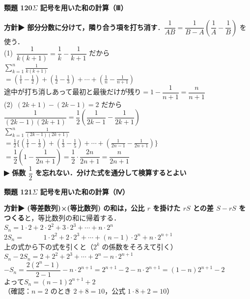 \documentclass[a4paper,11pt]{ltjsarticle}
\newcommand{\ans}[2]{\Needspace{5\baselineskip}\vspace{6pt}%
  {\sffamily\bfseries 類題 #1\quad #2}\par}
\newcommand{\point}[1]{\textsf{\bfseries ▶ #1}}
\begin{document}
\ans{120}{$\Sigma$ 記号を用いた和の計算（Ⅲ）}
\begin{kai}
\textbf{方針}\quad \point{部分分数に分けて，隣り合う項を打ち消す}．$\dfrac1{AB}=\dfrac1{B-A}\left(\dfrac1A-\dfrac1B\right)$ を使う．\\[2pt]
(1)\ $\dfrac1{k(k+1)}=\dfrac1k-\dfrac1{k+1}$ だから\\
\hspace*{1.5em}$\displaystyle\sum_{k=1}^n\frac1{k(k+1)}$\\
\hspace*{3em}$\displaystyle=\left(\frac11-\frac12\right)+\left(\frac12-\frac13\right)+\cdots+\left(\frac1n-\frac1{n+1}\right)$\\
\hspace*{1.5em}途中が打ち消しあって最初と最後だけが残り\quad $=1-\dfrac1{n+1}=\dfrac n{n+1}$\\[2pt]
(2)\ $(2k+1)-(2k-1)=2$ だから\quad $\dfrac1{(2k-1)(2k+1)}=\dfrac12\left(\dfrac1{2k-1}-\dfrac1{2k+1}\right)$\\
\hspace*{1.5em}$\displaystyle\sum_{k=1}^n\frac1{(2k-1)(2k+1)}$\\
\hspace*{3em}$\displaystyle=\frac12\biggl\{\left(\frac11-\frac13\right)+\left(\frac13-\frac15\right)+\cdots+\left(\frac1{2n-1}-\frac1{2n+1}\right)\biggr\}$\\
\hspace*{1.5em}$=\dfrac12\left(1-\dfrac1{2n+1}\right)=\dfrac12\cdot\dfrac{2n}{2n+1}=\dfrac n{2n+1}$\\
\hspace*{1.5em}\point{係数 $\dfrac12$ を忘れない．分けた式を通分して検算するとよい}
\end{kai}

\ans{121}{$\Sigma$ 記号を用いた和の計算（Ⅳ）}
\begin{kai}
\textbf{方針}\quad \point{(等差数列)×(等比数列) の和は，公比 $r$ を掛けた $rS$ との差 $S-rS$ をつくる}と，等比数列の和に帰着する．\\[2pt]
$S_n=1\cdot2+2\cdot2^2+3\cdot2^3+\cdots+n\cdot2^n$\\
$2S_n=\phantom{1\cdot2+{}}1\cdot2^2+2\cdot2^3+\cdots+(n-1)\cdot2^n+n\cdot2^{n+1}$\\[2pt]
上の式から下の式を引くと（$2^k$ の係数をそろえて引く）\\
\hspace*{1.5em}$S_n-2S_n=2+2^2+2^3+\cdots+2^n-n\cdot2^{n+1}$\\
\hspace*{1.5em}$-S_n=\dfrac{2(2^n-1)}{2-1}-n\cdot2^{n+1}=2^{n+1}-2-n\cdot2^{n+1}=(1-n)2^{n+1}-2$\\[2pt]
よって\quad $S_n=(n-1)2^{n+1}+2$\\
（確認：$n=2$ のとき $2+8=10$，公式 $1\cdot8+2=10$）
\end{kai}
\end{document}
